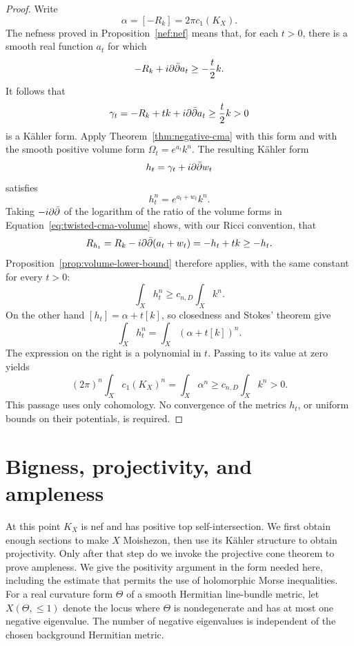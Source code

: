 \begin{proof}
Write
\[
 \alpha=[-R_k]=2\pi c_1(K_X).
\]
The nefness proved in Proposition~\ref{nef:nef} means that, for each
$t>0$, there is
a smooth real function $a_t$ for which
\[
 -R_k+i\partial\bar\partial a_t\ge-\frac t2 k.
\]
It follows that
\[
 \gamma_t=-R_k+tk+i\partial\bar\partial a_t\ge\frac t2 k>0
\]
is a K\"ahler form.  Apply Theorem~\ref{thm:negative-cma} with this
form and with the smooth positive volume form
$\Omega_t=e^{a_t}k^n$.  The resulting K\"ahler form
\[
 h_t=\gamma_t+i\partial\bar\partial w_t
\]
satisfies
\begin{equation}
\label{eq:twisted-cma-volume}
 h_t^n=e^{a_t+w_t}k^n.
\end{equation}
Taking $-i\partial\bar\partial$ of the logarithm of the ratio of the volume forms in
Equation~\eqref{eq:twisted-cma-volume} shows, with our Ricci convention, that
\begin{equation}
\label{eq:twisted-ricci-equation}
 R_{h_t}=R_k-i\partial\bar\partial(a_t+w_t)=-h_t+tk\ge-h_t.
\end{equation}
Proposition~\ref{prop:volume-lower-bound} therefore applies, with the
same constant for every $t>0$:
\[
 \int_Xh_t^n\ge c_{n,D}\int_Xk^n.
\]
On the other hand $[h_t]=\alpha+t[k]$, so closedness and Stokes'
theorem give
\[
 \int_Xh_t^n=\int_X(\alpha+t[k])^n.
\]
The expression on the right is a polynomial in $t$.  Passing to its
value at zero yields
\begin{equation}
\label{eq:positive-canonical-volume}
 (2\pi)^n\int_Xc_1(K_X)^n
 =\int_X\alpha^n
 \ge c_{n,D}\int_Xk^n>0.
\end{equation}
This passage uses only cohomology.  No convergence of the metrics
$h_t$, or uniform bounds on their potentials, is required.
\end{proof}

\section{Bigness, projectivity, and ampleness}
\label{sec:ampleness}

At this point $K_X$ is nef and has positive top self-intersection.
We first obtain enough sections to make $X$ Moishezon, then use its
K\"ahler structure to obtain projectivity. Only after that step do
we invoke the projective cone theorem to prove ampleness.
We give the positivity argument in the form needed here, including the
estimate that permits the use of holomorphic Morse inequalities.
For a real curvature form $\Theta$ of a smooth Hermitian line-bundle
metric, let $X(\Theta,\le1)$ denote the locus where $\Theta$ is
nondegenerate and has at most one negative eigenvalue.  The number of
negative eigenvalues is independent of the chosen background
Hermitian metric.

